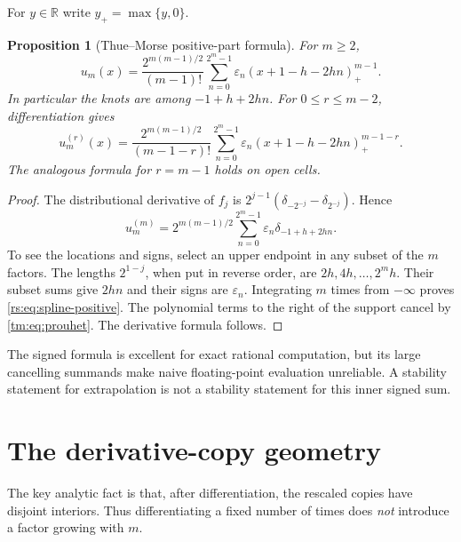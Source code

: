 \documentclass[11pt,a4paper,oneside,openany]{book}
\numberwithin{equation}{chapter}
\newtheorem{proposition}[theorem]{Proposition}
\theoremstyle{definition}
\theoremstyle{remark}
\newcommand{\eps}{\varepsilon}
\newcommand{\R}{\mathbb R}
\begin{document}
For $y\in\R$ write $y_+=\max\{y,0\}$.
\begin{proposition}[Thue--Morse positive-part formula]\label{rs:prop:positive-part}
For $m\geq2$,
\begin{equation}
 u_m(x)=\frac{2^{m(m-1)/2}}{(m-1)!}
 \sum_{n=0}^{2^m-1}\eps_n
       (x+1-h-2hn)_+^{m-1}.
 \label{rs:eq:spline-positive}
\end{equation}
In particular the knots are among $-1+h+2hn$.
For $0\leq r\leq m-2$, differentiation gives
\begin{equation}
 u_m^{(r)}(x)=\frac{2^{m(m-1)/2}}{(m-1-r)!}
 \sum_{n=0}^{2^m-1}\eps_n
       (x+1-h-2hn)_+^{m-1-r}.
 \label{rs:eq:spline-deriv-positive}
\end{equation}
The analogous formula for $r=m-1$ holds on open cells.
\end{proposition}
\begin{proof}
The distributional derivative of $f_j$ is
$2^{j-1}(\delta_{-2^{-j}}-\delta_{2^{-j}})$. Hence
\begin{equation}
 u_m^{(m)}=2^{m(m-1)/2}
 \sum_{n=0}^{2^m-1}\eps_n\delta_{-1+h+2hn}.
\end{equation}
To see the locations and signs, select an upper endpoint in any subset
of the $m$ factors. The lengths $2^{1-j}$, when put in reverse order,
are $2h,4h,\ldots,2^mh$. Their subset sums give $2hn$ and their signs
are $\eps_n$. Integrating $m$ times from $-\infty$ proves
\eqref{rs:eq:spline-positive}. The polynomial terms to the right of the
support cancel by \eqref{tm:eq:prouhet}. The derivative formula follows.
\end{proof}

The signed formula is excellent for exact rational computation, but
its large cancelling summands make naive floating-point evaluation
unreliable. A stability statement for extrapolation is not a stability
statement for this inner signed sum.
\chapter{The derivative-copy geometry}\label{rs:sec:derivative}

The key analytic fact is that, after differentiation, the rescaled
copies have disjoint interiors. Thus differentiating a fixed number of
times does \emph{not} introduce a factor growing with $m$.
\end{document}

